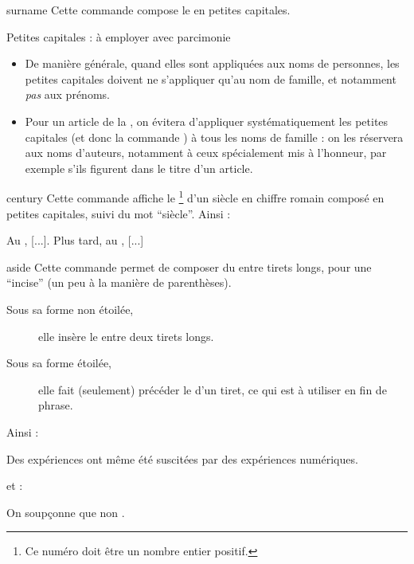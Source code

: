 \begin{docCommand}{surname}{}
  Cette commande compose le  en petites capitales.
  \begin{dbwarning}{Petites capitales : à employer avec parcimonie}{}
    \begin{itemize}
    \item De manière générale, quand elles sont appliquées aux noms de
      personnes, les petites capitales doivent ne s'appliquer qu'au nom de
      famille, et notamment \emph{pas} aux prénoms.
    \item Pour un article de la \gzt{}, on évitera d'appliquer systématiquement
      les petites capitales (et donc la commande ) à tous les
      noms de famille : on les réservera aux noms d'auteurs, notamment à ceux
      spécialement mis à l'honneur, par exemple s'ils figurent dans le titre
      d'un article.
    \end{itemize}
  \end{dbwarning}
\end{docCommand}

\begin{docCommand}{century}{}
  Cette commande affiche le \footnote{Ce numéro doit être un nombre
    entier positif.} d'un siècle en chiffre romain composé en petites capitales,
  suivi du mot \enquote{siècle}. Ainsi :
\begin{bodycode}
Au , [...]. Plus tard, au , [...]
\end{bodycode}
\end{docCommand}

\begin{docCommand}{aside}{}
  Cette commande permet de composer du  entre tirets longs, pour une
  \enquote{incise} (un peu à la manière de parenthèses).
  \begin{description}
  \item[Sous sa forme non étoilée,] elle insère le  entre deux
    tirets longs.
  \item[Sous sa forme étoilée,] elle fait (seulement) précéder le 
    d'un tiret, ce qui est à utiliser en fin de phrase.
  \end{description}
  Ainsi :
\begin{bodycode}
Des expériences  ont même été suscitées
par des expériences numériques.
\end{bodycode}
  et :
\begin{bodycode}
On soupçonne que non .
\end{bodycode}
\end{docCommand}

